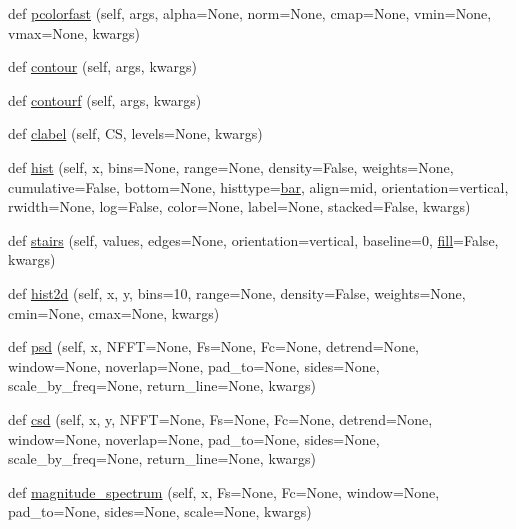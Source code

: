 \begin{DoxyCompactItemize}
def \hyperlink{classmatplotlib_1_1axes_1_1__axes_1_1Axes_a2b58a8da3ff2f5a04c32cfff1cdfbe88}{pcolorfast} (self, args, alpha=None, norm=None, cmap=None, vmin=None, vmax=None, kwargs)
\item 
def \hyperlink{classmatplotlib_1_1axes_1_1__axes_1_1Axes_aff19cf5d64d00477605cb6c37aa20c73}{contour} (self, args, kwargs)
\item 
def \hyperlink{classmatplotlib_1_1axes_1_1__axes_1_1Axes_af6a6bc1ccaa0284c1819fedcccd5adad}{contourf} (self, args, kwargs)
\item 
def \hyperlink{classmatplotlib_1_1axes_1_1__axes_1_1Axes_ac570d5069302f260ce8ff61fae425274}{clabel} (self, CS, levels=None, kwargs)
\item 
def \hyperlink{classmatplotlib_1_1axes_1_1__axes_1_1Axes_a79df73fc4d90f29a635144051bc12d32}{hist} (self, x, bins=None, range=None, density=False, weights=None, cumulative=False, bottom=None, histtype=\textquotesingle{}\hyperlink{classmatplotlib_1_1axes_1_1__axes_1_1Axes_abedbbc828dec3e3c060e79b5cdb8aced}{bar}\textquotesingle{}, align=\textquotesingle{}mid\textquotesingle{}, orientation=\textquotesingle{}vertical\textquotesingle{}, rwidth=None, log=False, color=None, label=None, stacked=False, kwargs)
\item 
def \hyperlink{classmatplotlib_1_1axes_1_1__axes_1_1Axes_a658809a0ca28b321c27d6853b50ecc4e}{stairs} (self, values, edges=None, orientation=\textquotesingle{}vertical\textquotesingle{}, baseline=0, \hyperlink{classmatplotlib_1_1axes_1_1__axes_1_1Axes_a97f36c68f65067af3a6254251f4c1018}{fill}=False, kwargs)
\item 
def \hyperlink{classmatplotlib_1_1axes_1_1__axes_1_1Axes_af2fec46fafae2b229dd3f4868c36138d}{hist2d} (self, x, y, bins=10, range=None, density=False, weights=None, cmin=None, cmax=None, kwargs)
\item 
def \hyperlink{classmatplotlib_1_1axes_1_1__axes_1_1Axes_ab4edfabd143c5dd434337450f190eb20}{psd} (self, x, N\+F\+FT=None, Fs=None, Fc=None, detrend=None, window=None, noverlap=None, pad\+\_\+to=None, sides=None, scale\+\_\+by\+\_\+freq=None, return\+\_\+line=None, kwargs)
\item 
def \hyperlink{classmatplotlib_1_1axes_1_1__axes_1_1Axes_ab55663123c6eca78b463443e13ea1cc8}{csd} (self, x, y, N\+F\+FT=None, Fs=None, Fc=None, detrend=None, window=None, noverlap=None, pad\+\_\+to=None, sides=None, scale\+\_\+by\+\_\+freq=None, return\+\_\+line=None, kwargs)
\item 
def \hyperlink{classmatplotlib_1_1axes_1_1__axes_1_1Axes_ab09d5d69b6e9b6d5525bfff1432e27c2}{magnitude\+\_\+spectrum} (self, x, Fs=None, Fc=None, window=None, pad\+\_\+to=None, sides=None, scale=None, kwargs)

\end{DoxyCompactItemize}
